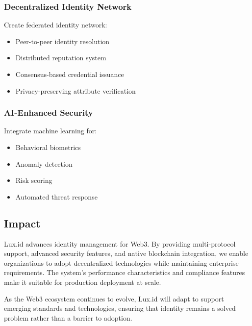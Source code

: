 \subsubsection{Decentralized Identity Network}

Create federated identity network:
\begin{itemize}
    \item Peer-to-peer identity resolution
    \item Distributed reputation system
    \item Consensus-based credential issuance
    \item Privacy-preserving attribute verification
\end{itemize}

\subsubsection{AI-Enhanced Security}

Integrate machine learning for:
\begin{itemize}
    \item Behavioral biometrics
    \item Anomaly detection
    \item Risk scoring
    \item Automated threat response
\end{itemize}

\subsection{Impact}

Lux.id advances identity management for Web3. By providing multi-protocol support, advanced security features, and native blockchain integration, we enable organizations to adopt decentralized technologies while maintaining enterprise requirements. The system's performance characteristics and compliance features make it suitable for production deployment at scale.

As the Web3 ecosystem continues to evolve, Lux.id will adapt to support emerging standards and technologies, ensuring that identity remains a solved problem rather than a barrier to adoption.

